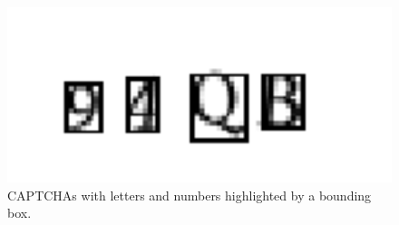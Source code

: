 \begin{figure}
\begin{minipage}{0.23\textwidth}
	\end{minipage}
	\begin{minipage}{0.23\textwidth}
		\centering
		\includegraphics[width=1\textwidth]{boundingbox_4.png} 
	\end{minipage}
	\caption{CAPTCHAs with letters and numbers highlighted by a bounding box.}
	\label{fig1-boundingboxCAPTCHA}
\end{figure}

